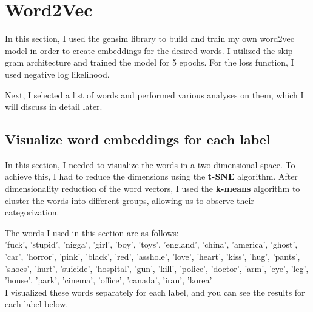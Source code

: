 \documentclass[a4paper]{article}
\begin{document}
\section{Word2Vec}


In this section, I used the gensim library to build and train my own word2vec model in order to create embeddings for the desired words. I utilized the skip-gram architecture and trained the model for 5 epochs. For the loss function, I used negative log likelihood.

Next, I selected a list of words and performed various analyses on them, which I will discuss in detail later.

\subsection*{Visualize word embeddings for each label}

In this section, I needed to visualize the words in a two-dimensional space. To achieve this, I had to reduce the dimensions using the \textbf{t-SNE}  algorithm. After dimensionality reduction of the word vectors, I used the \textbf{k-means}  algorithm to cluster the words into different groups, allowing us to observe their categorization.


The words I used in this section are as follows:\\

'fuck', 'stupid', 'nigga', 'girl', 'boy', 'toys', 'england', 'china', 'america', 'ghost',
      'car', 'horror', 'pink', 'black', 'red', 'asshole', 'love', 'heart', 'kiss', 'hug', 'pants',
      'shoes', 'hurt', 'suicide', 'hospital', 'gun', 'kill', 'police', 'doctor', 'arm', 'eye', 'leg',
      'house', 'park', 'cinema', 'office', 'canada', 'iran', 'korea'\\


I visualized these words separately for each label, and you can see the results for each label below.
\end{document}
